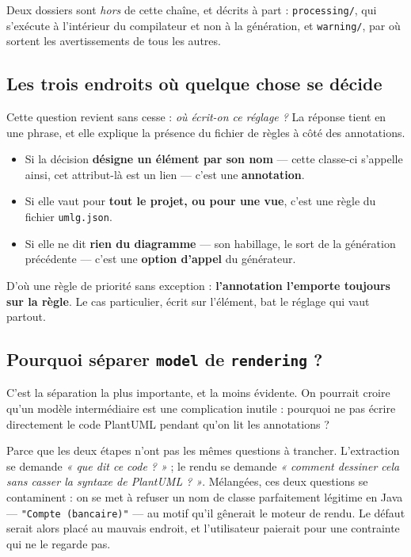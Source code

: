 \documentclass[12pt, a4paper]{article}
\begin{document}
\noindent Deux dossiers sont \emph{hors} de cette chaîne, et décrits à part :
\texttt{processing/}, qui s'exécute à l'intérieur du compilateur et non à la génération, et
\texttt{warning/}, par où sortent les avertissements de tous les autres.

\subsection{Les trois endroits où quelque chose se décide}

Cette question revient sans cesse : \emph{où écrit-on ce réglage ?} La réponse tient en une
phrase, et elle explique la présence du fichier de règles à côté des annotations.

\begin{itemize}
  \item Si la décision \textbf{désigne un élément par son nom} — cette classe-ci s'appelle ainsi,
        cet attribut-là est un lien — c'est une \textbf{annotation}.
  \item Si elle vaut pour \textbf{tout le projet, ou pour une vue}, c'est une règle du fichier
        \texttt{umlg.json}.
  \item Si elle ne dit \textbf{rien du diagramme} — son habillage, le sort de la génération
        précédente — c'est une \textbf{option d'appel} du générateur.
\end{itemize}

\noindent D'où une règle de priorité sans exception : \textbf{l'annotation l'emporte toujours sur
la règle}. Le cas particulier, écrit sur l'élément, bat le réglage qui vaut partout.

\subsection{Pourquoi séparer \texttt{model} de \texttt{rendering} ?}

C'est la séparation la plus importante, et la moins évidente. On pourrait croire qu'un modèle
intermédiaire est une complication inutile : pourquoi ne pas écrire directement le code
PlantUML pendant qu'on lit les annotations ?

Parce que les deux étapes n'ont pas les mêmes questions à trancher. L'extraction se demande
\emph{« que dit ce code ? »} ; le rendu se demande \emph{« comment dessiner cela sans casser la
syntaxe de PlantUML ? »}. Mélangées, ces deux questions se contaminent : on se met à refuser un
nom de classe parfaitement légitime en Java — \texttt{"Compte (bancaire)"} — au motif qu'il
gênerait le moteur de rendu. Le défaut serait alors placé au mauvais endroit, et l'utilisateur
paierait pour une contrainte qui ne le regarde pas.
\end{document}
